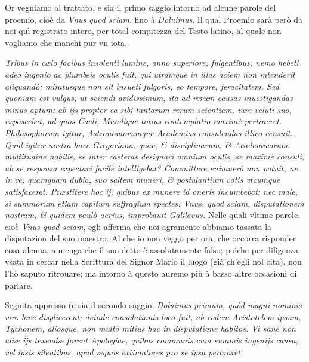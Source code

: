 \documentclass[11pt,twoside,openany]{book}
\begin{document}
\par\bigskip\noindent{}\enspace Or vegniamo al trattato, e sia il primo saggio intorno ad alcune parole del proemio, cioè da \textit{V}\textit{nus quod sciam}, fino à \textit{Doluimus}. Il qual Proemio sarà però da noi quì registrato intero, per total compitezza del Testo latino, al quale non vogliamo che manchi pur vn iota.


\textit{Tribus in cælo}\textit{ facibus insolenti lumine, anno superiore, fulgentibus; nemo hebeti adeò ingenio ac plumbeis oculis fuit, qui utramque in illas aciem non intenderit aliquandò; miratusque non sit insueti fulgoris, eo tempore, feracitatem. Sed quoniam est vulgus, ut sciendi avidissimum, ita ad rerum causas inuestigandas minus aptum: ab ijs propter ea sibi tantarum rerum scientiam, iure veluti suo, exposcebat, ad quos Caeli, Mundique totius contemplatio maximè pertineret. Philosophorum igitur, Astronomorumque Academias consulendas illico censuit. Quid igitur nostra haec Gregoriana, quae, \& disciplinarum, \& Academicorum multitudine nobilis, se inter caeteras designari omnium oculis, se maximè consuli, ab se responsa expectari facilè intelligebat? Committere enimuerò non potuit, ne in re, quamquam dubia, suo saltem muneri, \& postulantium votis vtcumque satisfaceret. Præstitere hoc ij, quibus ex munere id oneris incumbebat; nec male, si summorum etiam capitum suffragium spectes. Vnus, quod sciam, disputationem nostram, \& quidem paulò acrius, improbauit Galilaeus. }Nelle quali vltime parole, cioè \textit{V}\textit{nus quod sciam}, egli afferma che noi agramente abbiamo tassata la disputazion del suo maestro. Al che io non veggo per ora, che occorra risponder cosa alcuna, auuenga che il suo detto è assolutamente falso; poiche per diligenza vsata in cercar nella Scrittura del Signor Mario il luogo (già ch'egli nol cita), non l'hò saputo ritrouare; ma intorno à questo auremo più à basso altre occasioni di parlare.



\par\bigskip\noindent{}\enspace Seguita appresso (e sia il secondo saggio: \textit{Doluimus }\textit{primum, quòd magni nominis viro hæc displicerent; deinde consolationis loco fuit, ab eodem Aristotelem ipsum, Tychonem, aliosque, non multò mitius hac in disputatione habitos. Vt sane non aliæ ijs texendæ forent Apologiae, quibus communis cum summis ingenijs causa, vel ipsis silentibus, apud æquos extimatores pro se ipsa peroraret.}
\end{document}

